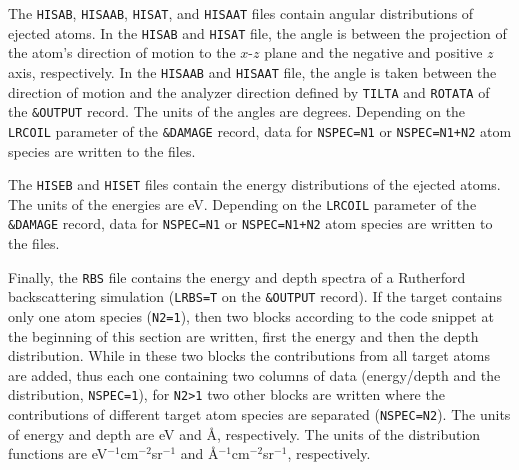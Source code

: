 The \texttt{HISAB}, \texttt{HISAAB}, \texttt{HISAT}, and \texttt{HISAAT} files
contain angular distributions of ejected atoms. In the \texttt{HISAB} and
\texttt{HISAT} file, the angle is between the projection of the atom's direction
of motion to the $x$-$z$ plane and the negative and positive $z$ axis,
respectively. In the \texttt{HISAAB} and \texttt{HISAAT} file, the angle is
taken between the direction of motion and the analyzer direction defined by
\texttt{TILTA} and \texttt{ROTATA} of the \texttt{\&OUTPUT} record. The units of
the angles are degrees. Depending on the \texttt{LRCOIL} parameter of the
\texttt{\&DAMAGE} record, data for \texttt{NSPEC=N1} or \texttt{NSPEC=N1+N2}
atom species are written to the files.  

The \texttt{HISEB} and \texttt{HISET} files contain the energy distributions of
the ejected atoms. The units of the energies are eV. Depending on the
\texttt{LRCOIL} parameter of the \texttt{\&DAMAGE} record, data for
\texttt{NSPEC=N1} or \texttt{NSPEC=N1+N2} atom species are written to the files.

Finally, the \texttt{RBS} file contains the energy and depth spectra of a
Rutherford backscattering simulation (\texttt{LRBS=T} on the \texttt{\&OUTPUT}
record). If the target contains only one atom species (\texttt{N2=1}), then two
blocks according to the code snippet at the beginning of this section are
written, first the energy and then the depth distribution. While in these two
blocks the contributions from all target atoms are added, thus each one
containing two columns of data (energy/depth and the distribution,
\texttt{NSPEC=1}), for \texttt{N2>1} two other blocks are written where the
contributions of different target atom species are separated
(\texttt{NSPEC=N2}). The units of energy and depth are eV and \AA, respectively.
The units of the distribution functions are eV$^{-1}$cm$^{-2}$sr$^{-1}$ and
\AA$^{-1}$cm$^{-2}$sr$^{-1}$, respectively.  
